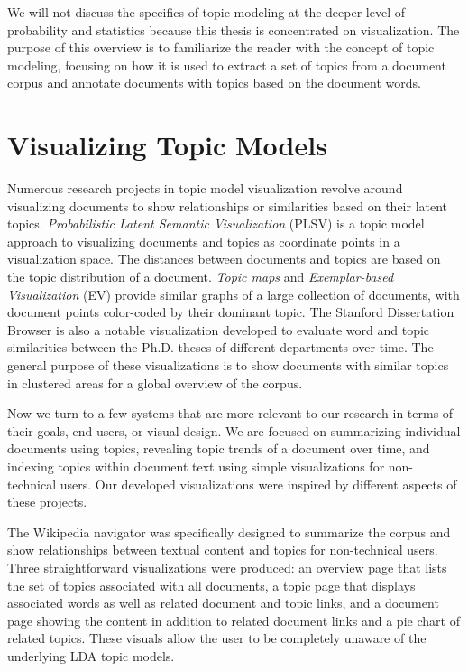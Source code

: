 We will not discuss the specifics of topic modeling at the deeper level of probability and statistics because this thesis is concentrated on visualization. The purpose of this overview is to familiarize the reader with the concept of topic modeling, focusing on how it is used to extract a set of topics from a document corpus and annotate documents with topics based on the document words.

\section{Visualizing Topic Models}

Numerous research projects in topic model visualization revolve around visualizing documents to show relationships or similarities based on their latent topics. \textit{Probabilistic Latent Semantic Visualization} (PLSV) \cite{plsv} is a topic model approach to visualizing documents and topics as coordinate points in a visualization space. The distances between documents and topics are based on the topic distribution of a document. \textit{Topic maps} \cite{topic-maps} and \textit{Exemplar-based Visualization} (EV) \cite{ev} provide similar graphs of a large collection of documents, with document points color-coded by their dominant topic. The Stanford Dissertation Browser \cite{interpretation-trust} is also a notable visualization developed to evaluate word and topic similarities between the Ph.D. theses of different departments over time. The general purpose of these visualizations is to show documents with similar topics in clustered areas for a global overview of the corpus.

Now we turn to a few systems that are more relevant to our research in terms of their goals, end-users, or visual design. We are focused on summarizing individual documents using topics, revealing topic trends of a document over time, and indexing topics within document text using simple visualizations for non-technical users. Our developed visualizations were inspired by different aspects of these projects.

The Wikipedia navigator \cite{wikipedia} was specifically designed to summarize the corpus and show relationships between textual content and topics for non-technical users. Three straightforward visualizations were produced: an overview page that lists the set of topics associated with all documents, a topic page that displays associated words as well as related document and topic links, and a document page showing the content in addition to related document links and a pie chart of related topics. These visuals allow the user to be completely unaware of the underlying LDA topic models.

